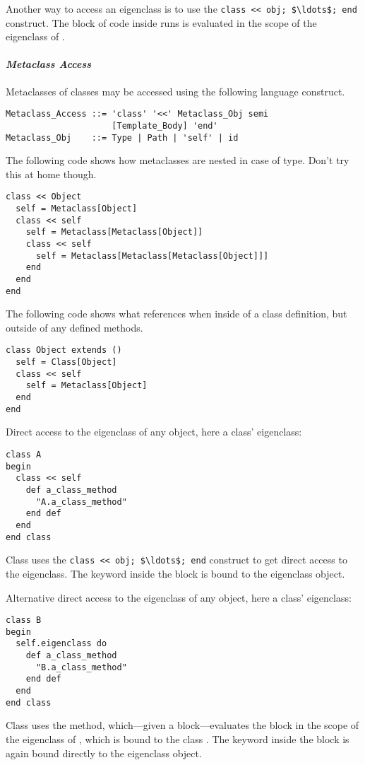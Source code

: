 Another way to access an eigenclass is to use the \lstinline!class << obj; $\ldots$; end! construct. The block of code inside runs is evaluated in the scope of the eigenclass of . 

\paragraph{\em Metaclass Access}
Metaclasses of classes may be accessed using the following language construct. 

\syntax\begin{lstlisting}
Metaclass_Access ::= 'class' '<<' Metaclass_Obj semi 
                     [Template_Body] 'end'
Metaclass_Obj    ::= Type | Path | 'self' | id
\end{lstlisting}

\example The following code shows how metaclasses are nested in case of  type. Don't try this at home though. 
\begin{lstlisting}
class << Object
  self = Metaclass[Object]
  class << self
    self = Metaclass[Metaclass[Object]]
    class << self
      self = Metaclass[Metaclass[Metaclass[Object]]]
    end
  end
end
\end{lstlisting}

\example The following code shows what  references when inside of a class definition, but outside of any defined methods. 
\begin{lstlisting}
class Object extends ()
  self = Class[Object]
  class << self
    self = Metaclass[Object]
  end
end
\end{lstlisting}

\example Direct access to the eigenclass of any object, here a class' eigenclass:
\begin{lstlisting}
class A
begin
  class << self
    def a_class_method
      "A.a_class_method"
    end def
  end
end class
\end{lstlisting}
Class  uses the \lstinline!class << obj; $\ldots$; end! construct to get direct access to the eigenclass. The keyword  inside the block is bound to the eigenclass object. 

\example Alternative direct access to the eigenclass of any object, here a class' eigenclass:
\begin{lstlisting}
class B
begin
  self.eigenclass do
    def a_class_method
      "B.a_class_method"
    end def
  end
end class
\end{lstlisting}
Class  uses the  method, which---given a block---evaluates the block in the scope of the eigenclass of , which is bound to the class . The keyword  inside the block is again bound directly to the eigenclass object. 

